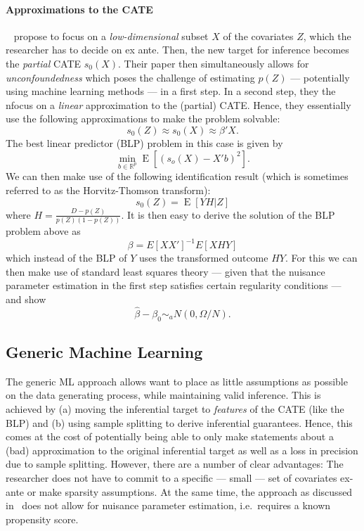 \documentclass[11pt, a4paper, leqno]{article}
\DeclareMathOperator{\E}{E}
\begin{document}
\paragraph*{Approximations to the CATE}
~\cite{semenova2021debiased} propose to focus on a \textit{low-dimensional} subset $X$ of the covariates $Z$, which the researcher has to decide on ex ante.
Then, the new target for inference becomes the \textit{partial} CATE $s_0(X)$.
Their paper then simultaneously allows for \textit{unconfoundedness} which poses the challenge of estimating $p(Z)$ --- potentially using machine learning methods --- in a first step.
In a second step, they the nfocus on a \textit{linear} approximation to the (partial) CATE\@.
Hence, they essentially use the following approximations to make the problem solvable:
\begin{equation*}
    s_0(Z) \approx s_0(X) \approx \beta'X.
\end{equation*}
The best linear predictor (BLP) problem in this case is given by
\begin{equation*}
    \min_{b\in\mathbb{R}^p} \E [(s_o(X) - X'b)^2].
\end{equation*}
We can then make use of the following identification result (which is sometimes referred to as the Horvitz-Thomson transform):
\begin{equation*}
    s_0(Z) = \E[YH|Z]
\end{equation*}
where $H = \frac{D-p(Z)}{p(Z)(1-p(Z))}$.
It is then easy to derive the solution of the BLP problem above as
\begin{equation*}
    \beta = E[XX']^{-1}E[XHY]
\end{equation*}
which instead of the BLP of $Y$ uses the transformed outcome $HY$.
For this we can then make use of standard least squares theory --- given that the nuisance parameter estimation in the first step satisfies certain regularity conditions --- and show
\begin{equation*}
    \hat{\beta} - \beta_0 \sim_a N(0, \Omega/N).
\end{equation*}


\subsection{Generic Machine Learning}
The generic ML approach allows want to place as little assumptions as possible on the data generating process, while maintaining valid inference.
This is achieved by (a) moving the inferential target to \textit{features} of the CATE (like the BLP) and (b) using sample splitting to derive inferential guarantees.
Hence, this comes at the cost of potentially being able to only make statements about a (bad) approximation to the original inferential target as well as a loss in precision due to sample splitting.
However, there are a number of clear advantages: The researcher does not have to commit to a specific --- small --- set of covariates ex-ante or make sparsity assumptions.
At the same time, the approach as discussed in~\cite{chernozhukov2023genml} does not allow for nuisance parameter estimation, i.e.\ requires a known propensity score.
\end{document}
